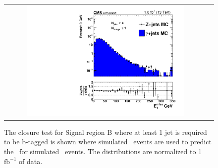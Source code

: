 \begin{figure}[!htb]
  \begin{center}
    \begin{tabular}{cc}
      \includegraphics[width=0.8\textwidth]{bkgd/figs/h_met_closure_rawMET_withb_SRB_novtxweight.pdf}
    \end{tabular}
    \caption{
      The closure test for Signal region B where at least 1 jet is required to be b-tagged is shown
      where simulated \gjets\ events are used to predict the \MET\ for simulated \zjets\ events.
      The distributions are normalized to 1 $\mathrm{fb^{-1}}$ of data.
      \label{fig:SRB_withb_closure}
    }
  \end{center}
\end{figure}

